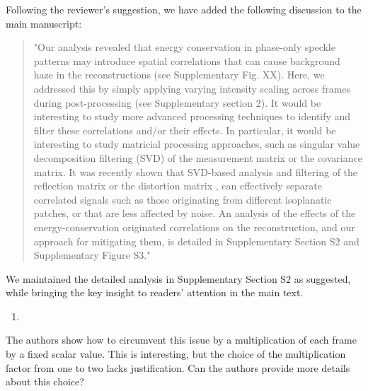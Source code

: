 \documentclass[12pt]{article}
\newenvironment{solved_reviewercomment}
    {\begin{tcolorbox}[width=\linewidth,colback=gray!5,colframe=solved_commentcolor!50,title=Reviewer Comment,left=5pt,right=5pt]}
    {\end{tcolorbox}}
\newenvironment{ourresponse}
    {\begin{tcolorbox}[width=\linewidth,breakable,enhanced,colback=gray!5,colframe=responsecolor!50,title=Response,left=5pt,right=5pt]}
    {\end{tcolorbox}}
\begin{document}
\begin{ourresponse}
Following the reviewer's suggestion, we have added the following discussion to the main manuscript: 
\begin{quote}
    "Our analysis revealed that energy conservation in phase-only speckle patterns may introduce spatial correlations that can cause background haze in the reconstructions (see Supplementary Fig. XX). Here, we addressed this by simply applying varying intensity scaling across frames during post-processing (see Supplementary section 2). It would be interesting to study more advanced processing techniques to identify and filter these correlations and/or their effects. In particular, it would be interesting to study matricial processing approaches, such as singular value decomposition filtering (SVD) of the measurement matrix or the covariance matrix. It was recently shown that SVD-based analysis and filtering of the reflection matrix or the distortion matrix \cite{jo2022through, badon2016smart, badon2020distortion},  can effectively separate correlated signals such as those originating from different isoplanatic patches, or that are less affected by noise. 
    An analysis of the effects of the energy-conservation originated correlations on the reconstruction, and our approach for mitigating them, is detailed in Supplementary Section S2 and Supplementary Figure S3."
\end{quote}
We maintained the detailed analysis in Supplementary Section S2 as suggested, while bringing the key insight to readers' attention in the main text.

\end{ourresponse}


    
\begin{enumerate}[label=\arabic*., resume]
\item \leavevmode
\end{enumerate}
\vspace{-1em}
\begin{solved_reviewercomment}
    The authors show how to circumvent this issue by a multiplication of each frame by a fixed scalar value. This is interesting, but the choice of the multiplication factor from one to two lacks justification. Can the authors provide more details about this choice? 
\end{solved_reviewercomment}
\end{document}
